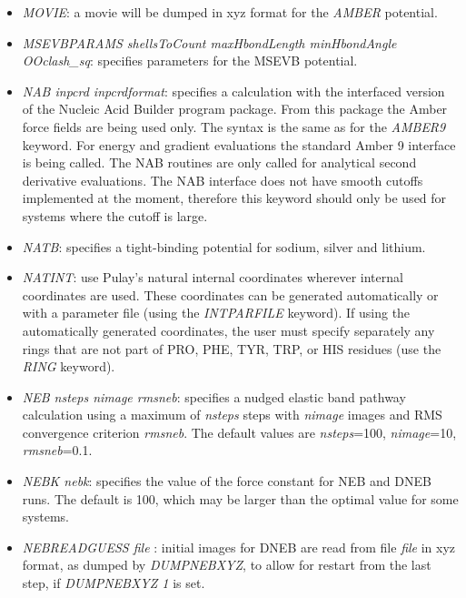 \documentclass[12pt,a4paper,dvips]{article}
\begin{document}
\begin{itemize}
\item {\it MOVIE\/}: a movie will be dumped in xyz format for the {\it AMBER\/} potential.

\item {\it MSEVBPARAMS shellsToCount maxHbondLength minHbondAngle OOclash\_sq\/}: 
specifies parameters for the MSEVB potential.

\item {\it NAB inpcrd inpcrdformat\/}: specifies a calculation with the interfaced
version of the Nucleic Acid Builder program package. From this package the Amber force fields
are being used only. The syntax is the same as for the {\it AMBER9} keyword. For energy 
and gradient evaluations the standard Amber 9 interface is being called. The NAB routines 
are only called for analytical second derivative evaluations. The NAB interface does not 
have smooth cutoffs implemented at the moment, therefore this keyword should only be used 
for systems where the cutoff is large. 

\item {\it NATB\/}: specifies a tight-binding potential for sodium, silver and lithium.

\item {\it NATINT\/}: use Pulay's natural internal coordinates\cite{PulayFPB79, FogarasiZTP92}
  wherever internal coordinates are used. These coordinates can be generated
  automatically or with a parameter file (using the {\it INTPARFILE}
  keyword). If using the automatically generated coordinates, the user must
  specify separately any rings that are not part of PRO, PHE, TYR, TRP, or HIS
  residues (use the {\it RING} keyword).

\item {\it NEB nsteps nimage rmsneb\/}: specifies a nudged elastic band pathway 
calculation\cite{HenkelmanJ00,HenkelmanUJ00} using a maximum of {\it nsteps\/} steps with
{\it nimage\/} images and RMS convergence criterion {\it rmsneb\/}. The default values are
{\it nsteps\/}=100, {\it nimage\/}=10, {\it rmsneb\/}=0.1.

\item {\it NEBK nebk\/}: specifies the value of the force constant for NEB and 
DNEB runs. The default is 100, which may be larger than the optimal
value for some systems.

\item {\it NEBREADGUESS file \/}: initial images for DNEB are read from file {\it file} 
in xyz format, as dumped by {\it DUMPNEBXYZ\/}, to allow for restart from the last 
step, if {\it DUMPNEBXYZ 1\/} is set. 


\end{itemize}
\end{document}

